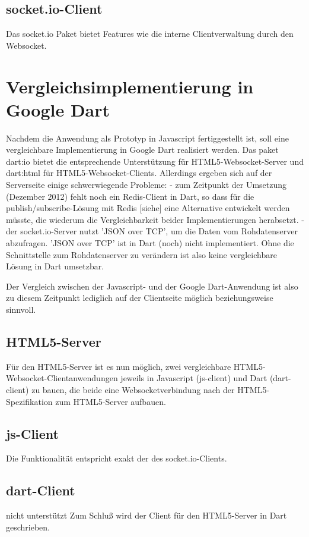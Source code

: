 \subsection{socket.io-Client}
Das socket.io Paket bietet Features wie die interne Clientverwaltung durch den Websocket.

\section{Vergleichsimplementierung in Google Dart}

Nachdem die Anwendung als Prototyp in Javascript fertiggestellt ist, soll eine vergleichbare Implementierung in Google Dart realisiert werden. Das paket dart:io bietet die entsprechende Unterstützung für HTML5-Websocket-Server und dart:html für HTML5-Websocket-Clients.
Allerdings ergeben sich auf der Serverseite einige schwerwiegende Probleme:
- zum Zeitpunkt der Umsetzung (Dezember 2012) fehlt noch ein Redis-Client in Dart, so dass für die publish/subscribe-Lösung mit Redis [siehe] eine Alternative entwickelt werden müsste, die wiederum die Vergleichbarkeit beider Implementierungen herabsetzt.
- der socket.io-Server nutzt 'JSON over TCP', um die Daten vom Rohdatenserver abzufragen. 'JSON over TCP' ist in Dart (noch) nicht implementiert. Ohne die Schnittstelle zum Rohdatenserver zu verändern ist also keine vergleichbare Lösung in Dart umsetzbar.

Der Vergleich zwischen der Javascript- und der Google Dart-Anwendung ist also zu diesem Zeitpunkt lediglich auf der Clientseite möglich beziehungsweise sinnvoll. 


\subsection{HTML5-Server}

Für den HTML5-Server ist es nun möglich, zwei vergleichbare HTML5-Websocket-Clientanwendungen jeweils in Javascript (js-client) und Dart (dart-client) zu bauen, die beide eine Websocketverbindung nach der HTML5-Spezifikation zum HTML5-Server aufbauen.

\subsection{js-Client}
Die Funktionalität entspricht exakt der des socket.io-Clients. 

\subsection{dart-Client}nicht unterstützt
Zum Schluß wird der Client für den HTML5-Server in Dart geschrieben. 




